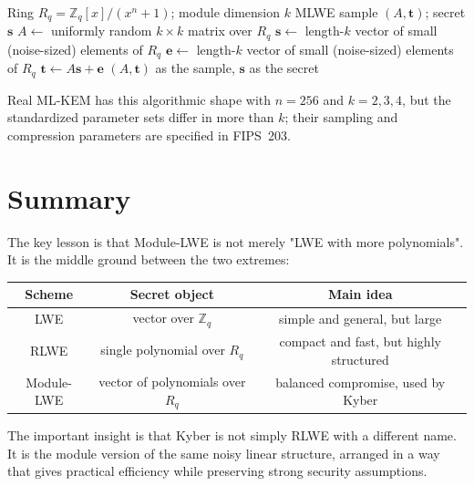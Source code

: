 \begin{algorithm}[H]
\caption{Module-LWE Sample Generation}
\label{alg:mlwe-sample}
\begin{algorithmic}[1]
\Require Ring $R_q = \mathbb{Z}_q[x]/(x^n+1)$; module dimension $k$
\Ensure MLWE sample $(A,\mathbf{t})$; secret $\mathbf{s}$
\State $A \gets$ uniformly random $k\times k$ matrix over $R_q$
\State $\mathbf{s} \gets$ length-$k$ vector of small (noise-sized) elements of $R_q$ 
\State $\mathbf{e} \gets$ length-$k$ vector of small (noise-sized) elements of $R_q$ 
\State $\mathbf{t} \gets A\mathbf{s} + \mathbf{e}$ 
\State \Return $(A,\mathbf{t})$ as the sample, $\mathbf{s}$ as the secret
\end{algorithmic}
\end{algorithm}

Real ML-KEM has this algorithmic shape with $n=256$ and $k=2,3,4$, but the standardized parameter sets differ in more than $k$; their sampling and compression parameters are specified in FIPS~203.

\section{Summary}

The key lesson is that Module-LWE is not merely "LWE with more polynomials". It is the middle ground between the two extremes:

\begin{table}[h]
\centering
\begin{tabular}{|c|c|c|}
\hline
Scheme & Secret object & Main idea \\
\hline
LWE & vector over $\mathbb{Z}_q$ & simple and general, but large \\
\hline
RLWE & single polynomial over $R_q$ & compact and fast, but highly structured \\
\hline
Module-LWE & vector of polynomials over $R_q$ & balanced compromise, used by Kyber \\
\hline
\end{tabular}
\end{table}

The important insight is that Kyber is not simply RLWE with a different name. It is the module version of the same noisy linear structure, arranged in a way that gives practical efficiency while preserving strong security assumptions.

\printbibliography[heading=chapterrefs]
